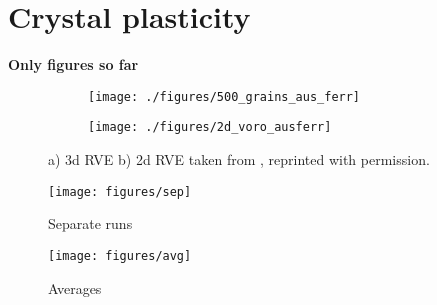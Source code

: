 \documentclass[crystal_plast.tex]{subfiles}
\begin{document}
\newpage
\chapter{Crystal plasticity}

\textbf{Only figures so far}

 \begin{figure}
\centering
\begin{subfigure}{.5\textwidth}
  \centering
  \texttt{[image: ./figures/500\_grains\_aus\_ferr]}
  \caption{}
  \label{fig:ausferr_3d}
\end{subfigure}%
\begin{subfigure}{.6\textwidth}
  \centering
  \texttt{[image: ./figures/2d\_voro\_ausferr]}
  \caption{}
  \label{fig:ausferr_2d}
\end{subfigure}
\caption{a) 3d RVE  b) 2d RVE taken from \cite{lillbacka2007multiscale}, reprinted with permission.}
\label{fig:ausferr}
\end{figure}


\begin{figure}[ht]
\centering
\texttt{[image: figures/sep]}
\caption{Separate runs}
\label{fig:sep}
\end{figure}

\begin{figure}[ht]
\centering
\texttt{[image: figures/avg]}
\caption{Averages}
\label{fig:avg}
\end{figure}



\newpage
\end{document}
